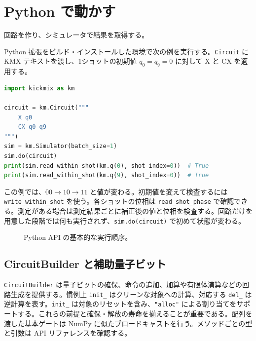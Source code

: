 \documentclass[a4paper,11pt,oneside,openany]{ltjsbook}
\newcommand{\code}[1]{\nolinkurl{#1}}
\begin{document}
\chapter{Python で動かす}
\begin{goal}回路を作り、シミュレータで結果を取得する。\end{goal}
Python 拡張をビルド・インストールした環境で次の例を実行する。\code{Circuit} に KMX テキストを渡し、1ショットの初期値 $q_0=q_9=0$ に対して X と CX を適用する。
\begin{lstlisting}[language=Python]
import kickmix as km

circuit = km.Circuit("""
    X q0
    CX q0 q9
""")
sim = km.Simulator(batch_size=1)
sim.do(circuit)
print(sim.read_within_shot(km.q(0), shot_index=0))  # True
print(sim.read_within_shot(km.q(9), shot_index=0))  # True
\end{lstlisting}
この例では、$00\to10\to11$ と値が変わる。初期値を変えて検査するには \code{write_within_shot} を使う。各ショットの位相は \code{read_shot_phase} で確認できる。測定がある場合は測定結果ごとに補正後の値と位相を検査する。回路だけを用意した段階では何も実行されず、\code{sim.do(circuit)} で初めて状態が変わる。
\begin{figure}[htbp]\centering
{}\caption{Python API の基本的な実行順序。}\end{figure}
\section{CircuitBuilder と補助量子ビット}
\code{CircuitBuilder} は量子ビットの確保、命令の追加、加算や有限体演算などの回路生成を提供する。慣例上 \code{init_} はクリーンな対象への計算、対応する \code{del_} は逆計算を表す。\code{init_} は対象のリセットを含み、\code{"alloc"} による割り当てをサポートする。これらの前提と確保・解放の寿命を揃えることが重要である。配列を渡した基本ゲートは NumPy に似たブロードキャストを行う。メソッドごとの型と引数は API リファレンスを確認する。
\end{document}
